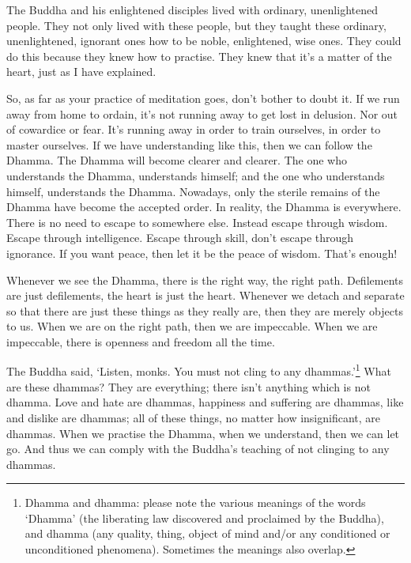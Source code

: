 The Buddha and his enlightened disciples lived with ordinary, un\-en\-light\-ened people. They not only lived with these people, but they taught these ordinary, unenlightened, ignorant ones how to be noble, enlightened, wise ones. They could do this because they knew how to practise. They knew that it's a matter of the heart, just as I have explained. 

So, as far as your practice of meditation goes, don't bother to doubt it. If we run away from home to ordain, it's not running away to get lost in delusion. Nor out of cowardice or fear. It's running away in order to train ourselves, in order to master ourselves. If we have understanding like this, then we can follow the Dhamma. The Dhamma will become clearer and clearer. The one who understands the Dhamma, understands himself; and the one who understands himself, understands the Dhamma. Nowadays, only the sterile remains of the Dhamma have become the accepted order. In reality, the Dhamma is everywhere. There is no need to escape to somewhere else. Instead escape through wisdom. Escape through intelligence. Escape through skill, don't escape through ignorance. If you want peace, then let it be the peace of wisdom. That's enough! 

Whenever we see the Dhamma, there is the right way, the right path. Defilements are just defilements, the heart is just the heart. Whenever we detach and separate so that there are just these things as they really are, then they are merely objects to us. When we are on the right path, then we are impeccable. When we are impeccable, there is openness and freedom all the time. 

The Buddha said, `Listen, monks. You must not cling to any dhammas.'\footnote{Dhamma and dhamma: please note the various meanings of the words `Dhamma' (the liberating law discovered and proclaimed by the Buddha), and dhamma (any quality, thing, object of mind and/or any conditioned or unconditioned phenomena). Sometimes the meanings also overlap.} What are these dhammas? They are everything; there isn't anything which is not dhamma. Love and hate are dhammas, happiness and suffering are dhammas, like and dislike are dhammas; all of these things, no matter how insignificant, are dhammas. When we practise the Dhamma, when we understand, then we can let go. And thus we can comply with the Buddha's teaching of not clinging to any dhammas. 

